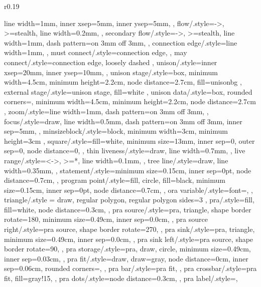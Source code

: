 \documentclass[acmsmall,authorversion,nonacm]{acmart}
\begin{document}
\begin{wrapfigure}{r}{0.19\textwidth}
{{{{    line width=1mm,
    inner xsep=5mm,
    inner ysep=5mm,
  },
  flow/.style={->,
    >=stealth,
    line width=0.2mm,
  },
  secondary flow/.style={->,
    >=stealth,
    line width=1mm,
    dash pattern=on 3mm off 3mm,
  },
  connection edge/.style={line width=1mm,
  },
  must connect/.style={connection edge,
  },
  may connect/.style={connection edge,
    loosely dashed
  },
  unison/.style={inner xsep=20mm,
    inner ysep=10mm,
  },
  unison stage/.style={box,
    minimum width=4.5cm,
    minimum height=2.2cm,
    node distance=2.7cm,
    fill=unisonbg
  },
  external stage/.style={unison stage,
    fill=white
  },
  unison data/.style={box,
    rounded corners=\cornerRadius,
    minimum width=4.5cm,
    minimum height=2.2cm,
    node distance=2.7cm
  },
  zoom/.style={line width=1mm,
    dash pattern=on 3mm off 3mm,
  },
  focus/.style={draw,
    line width=0.5mm,
    dash pattern=on 3mm off 3mm,
    inner sep=5mm,
  },
  minsizeblock/.style={block,
    minimum width=3cm,
    minimum height=3cm
  },
  square/.style={fill=white,
    minimum size=13mm,
    inner sep=0,
    outer sep=0,
    node distance=0,
  },
  thin liveness/.style={draw,
    line width=0.7mm,
  },
  live range/.style={<->,
      >=*,
      line width=0.1mm,
    },
  tree line/.style={draw,
    line width=0.35mm,
  },
  statement/.style={minimum size=0.15cm,
    inner sep=0pt,
    node distance=0.7cm,
  },
  program point/.style={fill,
    circle,
    fill=black,
    minimum size=0.15cm,
    inner sep=0pt,
    node distance=0.7cm,
  },
  ora variable/.style={font=\small,
  },
  triangle/.style = {draw, regular polygon, regular polygon sides=3 },
  pra/.style={fill,
    fill=white,
    node distance=0.3cm,
  },
  pra source/.style={pra,
    triangle,
    shape border rotate=180,
    minimum size=0.49cm,
    inner sep=0.0cm,
  },
  pra source right/.style={pra source,
    shape border rotate=270,
  },
  pra sink/.style={pra,
    triangle,
    minimum size=0.49cm,
    inner sep=0.0cm,
  },
  pra sink left/.style={pra source,
    shape border rotate=90,
  },
  pra storage/.style={pra,
    draw,
    circle,
    minimum size=0.49cm,
    inner sep=0.03cm,
  },
  pra fit/.style={draw,
    draw=gray,
    node distance=0cm,
    inner sep=0.06cm,
    rounded corners=\cornerRadius,
  },
  pra bar/.style={pra fit,
  },
  pra crossbar/.style={pra fit,
    fill=gray!15,
  },
  pra dots/.style={node distance=0.3cm,
  },
  pra label/.style={},
} 

}}
\end{wrapfigure}
\end{document}
